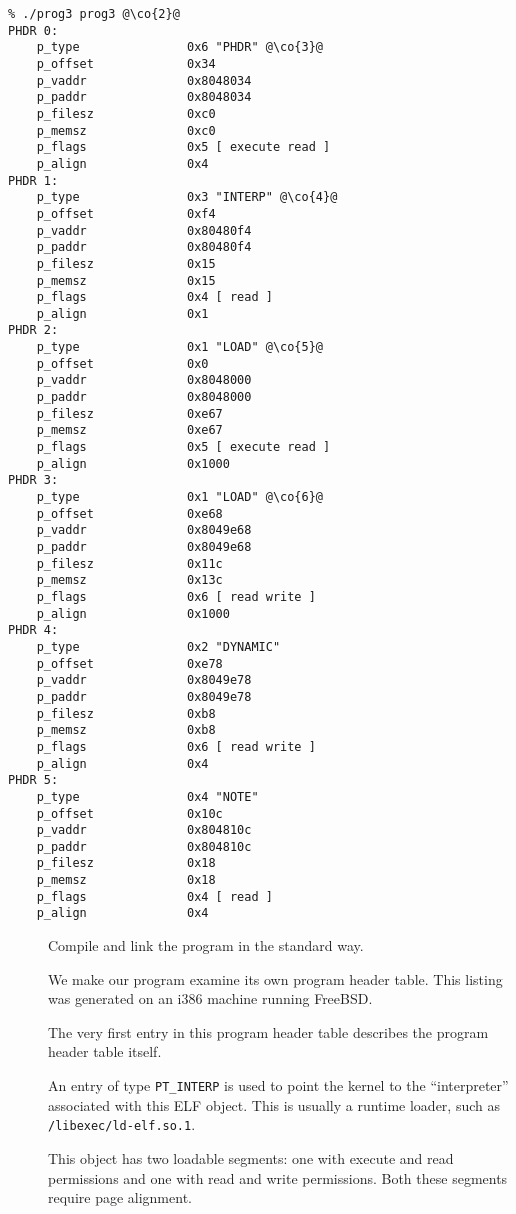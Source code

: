 \documentclass[a4paper,pdftex]{book}
\makeatletter
\newcommand{\constant}[1]{\texttt{#1}}
\newcommand{\filename}[1]{\texttt{#1}}
\newcommand{\trade}{\texttrademark\xspace}
\newenvironment{callout}[2][black]{%
  \begingroup\newcommand{\@cocolor}{#1}%
  \setlength{\shadowsize}{1.2pt}%
  \newcommand{\@cogroup}[1]{#2}}{\endgroup}
\newcommand{\@co}[1]{\shadowbox{\color{\@cocolor}#1}}
\newcommand{\co}[1]{%
  \hypertarget{\@cogroup.#1.co}{%
    \hyperlink{\@cogroup.#1.cr}{\@co{#1}}}}
\newcommand{\coref}[1]{%
  \hypertarget{\@cogroup.#1.cr}{%
    \hyperlink{\@cogroup.#1.co}{\@co{#1}}}}
\makeatother
\begin{document}
\begin{callout}{scr3}
  \begin{lstlisting}[language={}, basicstyle=\small\ttfamily,
      label=scr.prog3, caption=Compiling and Running prog3]
% cc -o prog3 prog3.c -lelf @\co{1}@
% ./prog3 prog3 @\co{2}@
PHDR 0:
    p_type               0x6 "PHDR" @\co{3}@
    p_offset             0x34
    p_vaddr              0x8048034
    p_paddr              0x8048034
    p_filesz             0xc0
    p_memsz              0xc0
    p_flags              0x5 [ execute read ]
    p_align              0x4
PHDR 1:
    p_type               0x3 "INTERP" @\co{4}@
    p_offset             0xf4
    p_vaddr              0x80480f4
    p_paddr              0x80480f4
    p_filesz             0x15
    p_memsz              0x15
    p_flags              0x4 [ read ]
    p_align              0x1
PHDR 2:
    p_type               0x1 "LOAD" @\co{5}@
    p_offset             0x0
    p_vaddr              0x8048000
    p_paddr              0x8048000
    p_filesz             0xe67
    p_memsz              0xe67
    p_flags              0x5 [ execute read ]
    p_align              0x1000
PHDR 3:
    p_type               0x1 "LOAD" @\co{6}@
    p_offset             0xe68
    p_vaddr              0x8049e68
    p_paddr              0x8049e68
    p_filesz             0x11c
    p_memsz              0x13c
    p_flags              0x6 [ read write ]
    p_align              0x1000
PHDR 4:
    p_type               0x2 "DYNAMIC"
    p_offset             0xe78
    p_vaddr              0x8049e78
    p_paddr              0x8049e78
    p_filesz             0xb8
    p_memsz              0xb8
    p_flags              0x6 [ read write ]
    p_align              0x4
PHDR 5:
    p_type               0x4 "NOTE"
    p_offset             0x10c
    p_vaddr              0x804810c
    p_paddr              0x804810c
    p_filesz             0x18
    p_memsz              0x18
    p_flags              0x4 [ read ]
    p_align              0x4
  \end{lstlisting}

  \begin{description}
  \item[\coref{1}] Compile and link the program in the standard way.
  \item[\coref{2}] We make our program examine its own program header
    table.  This listing was generated on an i386\trade machine
    running FreeBSD\trade.
  \item[\coref{3}] The very first entry in this program header table
    describes the program header table itself.%
  \item[\coref{4}] An entry of type \constant{PT\_INTERP} is used to
    point the kernel to the ``interpreter'' associated with this ELF
    object.  This is usually a runtime loader, such as
    \filename{/libexec/ld-elf.so.1}.
  \item[\coref{5} \coref{6}] This object has two loadable segments:
    one with execute and read permissions and one with read and write
    permissions.  Both these segments require page alignment.%
  \end{description}
\end{callout}
\end{document}
